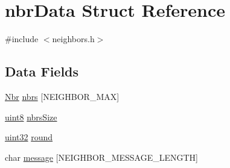 \hypertarget{structnbr_data}{
\section{nbrData Struct Reference}
\label{structnbr_data}
}


{\ttfamily \#include $<$neighbors.h$>$}

\subsection*{Data Fields}
\begin{DoxyCompactItemize}
\item 
\hyperlink{structnbr}{Nbr} \hyperlink{structnbr_data_a64816da8a476db5a23d82bb66193db9d}{nbrs} \mbox{[}NEIGHBOR\_\-MAX\mbox{]}
\item 
\hyperlink{typedefs_8h_adde6aaee8457bee49c2a92621fe22b79}{uint8} \hyperlink{structnbr_data_a449f41cc135e4d97d3bd56251b3652c8}{nbrsSize}
\item 
\hyperlink{typedefs_8h_a4b435a49c74bb91f284f075e63416cb6}{uint32} \hyperlink{structnbr_data_a46fcb260f89439d589d73a3f100cd738}{round}
\item 
char \hyperlink{structnbr_data_a8fe2ddd0714d3510cda53342ce42ccf4}{message} \mbox{[}NEIGHBOR\_\-MESSAGE\_\-LENGTH\mbox{]}
\end{DoxyCompactItemize}


